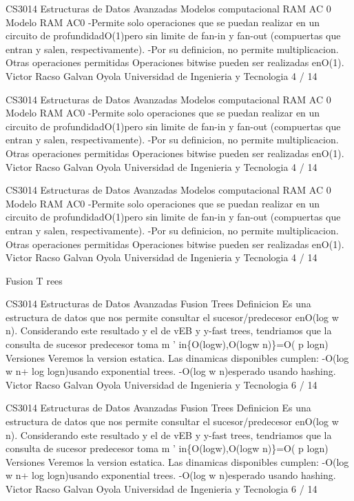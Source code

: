 \begin{description}[leftmargin=!,labelwidth=4.2em,style=nextline]
\item[Pag. 8] CS3014 Estructuras de Datos Avanzadas Modelos computacional RAM AC 0 Modelo RAM AC0 -Permite solo operaciones que se puedan realizar en un circuito de profundidadO(1)pero sin limite de fan-in y fan-out (compuertas que entran y salen, respectivamente). -Por su definicion, no permite multiplicacion. Otras operaciones permitidas Operaciones bitwise pueden ser realizadas enO(1). Victor Racso Galvan Oyola Universidad de Ingenieria y Tecnologia 4 / 14
\item[Pag. 9] CS3014 Estructuras de Datos Avanzadas Modelos computacional RAM AC 0 Modelo RAM AC0 -Permite solo operaciones que se puedan realizar en un circuito de profundidadO(1)pero sin limite de fan-in y fan-out (compuertas que entran y salen, respectivamente). -Por su definicion, no permite multiplicacion. Otras operaciones permitidas Operaciones bitwise pueden ser realizadas enO(1). Victor Racso Galvan Oyola Universidad de Ingenieria y Tecnologia 4 / 14
\item[Pag. 10] CS3014 Estructuras de Datos Avanzadas Modelos computacional RAM AC 0 Modelo RAM AC0 -Permite solo operaciones que se puedan realizar en un circuito de profundidadO(1)pero sin limite de fan-in y fan-out (compuertas que entran y salen, respectivamente). -Por su definicion, no permite multiplicacion. Otras operaciones permitidas Operaciones bitwise pueden ser realizadas enO(1). Victor Racso Galvan Oyola Universidad de Ingenieria y Tecnologia 4 / 14
\item[Pag. 11] Fusion T rees
\item[Pag. 12] CS3014 Estructuras de Datos Avanzadas Fusion Trees Definicion Es una estructura de datos que nos permite consultar el sucesor/predecesor enO(log w n). Considerando este resultado y el de vEB y y-fast trees, tendriamos que la consulta de sucesor predecesor toma m ' in\{O(logw),O(logw n)\}=O( p logn) Versiones Veremos la version estatica. Las dinamicas disponibles cumplen: -O(log w n+ log logn)usando exponential trees. -O(log w n)esperado usando hashing. Victor Racso Galvan Oyola Universidad de Ingenieria y Tecnologia 6 / 14
\item[Pag. 13] CS3014 Estructuras de Datos Avanzadas Fusion Trees Definicion Es una estructura de datos que nos permite consultar el sucesor/predecesor enO(log w n). Considerando este resultado y el de vEB y y-fast trees, tendriamos que la consulta de sucesor predecesor toma m ' in\{O(logw),O(logw n)\}=O( p logn) Versiones Veremos la version estatica. Las dinamicas disponibles cumplen: -O(log w n+ log logn)usando exponential trees. -O(log w n)esperado usando hashing. Victor Racso Galvan Oyola Universidad de Ingenieria y Tecnologia 6 / 14

\end{description}
